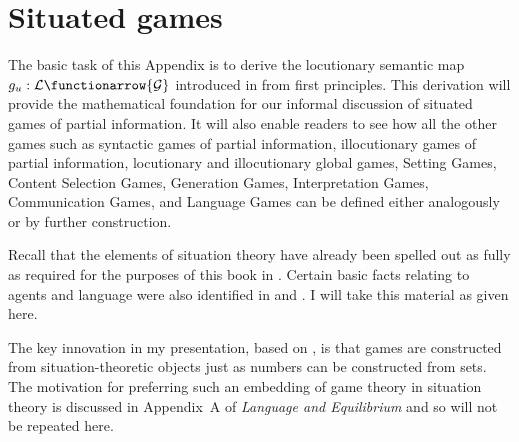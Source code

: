 \chapter{Situated games}

%
%
%       
%
%
%
%
%

The basic task of this Appendix is to derive the locutionary semantic map $g_u: {\cal L} \functionarrow {\cal G}$ introduced in  from first principles. This derivation will provide the mathematical foundation for our informal discussion of situated games of partial information. It will also enable readers to see how all the other games such as syntactic games of partial information, illocutionary games of partial information, locutionary and illocutionary global games, Setting Games, Content Selection Games, Generation Games, Interpretation Games, Communication Games, and Language Games can be defined either analogously or by further construction. 


Recall that the elements of situation theory have already been spelled out as fully as required for the purposes of this book in . Certain basic facts relating to agents and language were also identified in  and . I will take this material as given here. 

The key innovation in my presentation, based on \citet{parikh:diss,parikh:sga,parikh:ul,parikh:le}, is that games are constructed from situation-theoretic objects just as numbers can be constructed from sets. The motivation for preferring such an embedding of game theory in situation theory is discussed in Appendix~A of \emph{Language and Equilibrium} and so will not be repeated here.

